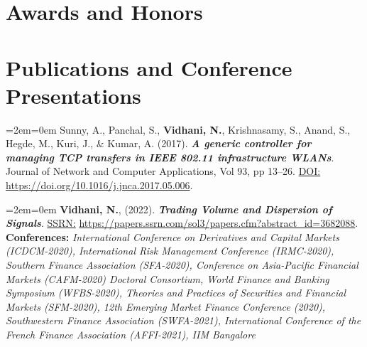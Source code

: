 \documentclass[11pt,a4paper,]{moderncv}
\begin{document}
\newpage

\hypertarget{awards-and-honors}{%
\section{Awards and Honors}\label{awards-and-honors}}

\nopagebreak

\hypertarget{publications-and-conference-presentations}{%
\section{Publications and Conference
Presentations}\label{publications-and-conference-presentations}}

\begingroup
\setlength{\parindent}{-0.5in}
\setlength{\leftskip}{0.5in}

\bgroup %
  \par%
  \medskip
  \leftskip=2em\rightskip=0em%
  \noindent\ignorespaces
Sunny, A., Panchal, S., \textbf{Vidhani, N.}, Krishnasamy, S., Anand, S., Hegde, M., Kuri, J., \& Kumar, A. (2017).
\textbf{\textit{A generic controller for managing TCP transfers in IEEE 802.11 infrastructure WLANs}}. Journal of Network and Computer Applications, Vol 93, pp 13--26. \underline{DOI:} \url{https://doi.org/10.1016/j.jnca.2017.05.006}.\\
%
  \par\medskip\egroup

\bgroup %
  \par%
  \medskip
  \leftskip=2em\rightskip=0em%
  \noindent\ignorespaces
\textbf{Vidhani, N.}, (2022). \textbf{\textit{Trading Volume and Dispersion of Signals}}. \underline{SSRN:} \url{https://papers.ssrn.com/sol3/papers.cfm?abstract_id=3682088}.\\
\textbf{Conferences:} \textit{International Conference on Derivatives and Capital Markets (ICDCM-2020), International Risk Management Conference (IRMC-2020), Southern Finance Association (SFA-2020), Conference on Asia-Pacific Financial Markets (CAFM-2020) Doctoral Consortium, World Finance and Banking Symposium (WFBS-2020), Theories and Practices of Securities and Financial Markets (SFM-2020), 12th Emerging Market Finance Conference (2020), Southwestern Finance Association (SWFA-2021), International Conference of the French Finance Association (AFFI-2021), IIM Bangalore}\\
%
  \par\medskip\egroup
\end{document}
